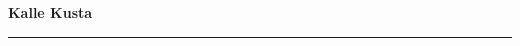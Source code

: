 \documentclass[10pt]{book}
\begin{document}
{
  \samepage
  \raggedbottom
  \raggedright
  \sloppy


  \vspace{0.2in}

  \noindent\begin{minipage}{.1\textwidth}
    \hfill\vspace{0.1in}
  \end{minipage}%
  \noindent\begin{minipage}{.8\textwidth}
    \centering
    \bfseries
    \large Kalle Kusta 
  \end{minipage}%
  \noindent\begin{minipage}{.1\textwidth}
      \hfill\vspace{0.1in}
  \end{minipage}

  \nopagebreak[4]
  \vspace{0.1in}
  \nopagebreak[4]
  \hrule height 0.05ex
  \nopagebreak[4]
  \vspace{-0.05in}




}
\end{document}
